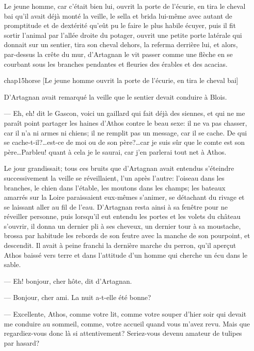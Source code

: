 Le jeune homme, car c'était bien lui, ouvrit la porte de l'écurie, en tira le cheval bai qu'il avait déjà monté la veille, le sella et brida lui-même avec autant de promptitude et de dextérité qu'eût pu le faire le plus habile écuyer, puis il fit sortir l'animal par l'allée droite du potager, ouvrit une petite porte latérale qui donnait sur un sentier, tira son cheval dehors, la referma derrière lui, et alors, par-dessus la crête du mur, d'Artagnan le vit passer comme une flèche en se courbant sous les branches pendantes et fleuries des érables et des acacias.

\begin{bwbigpic}
	[\basicscale] 
	{chap15horse}
	[Le jeune homme ouvrit la porte de l'écurie, en tira le cheval bai]
\end{bwbigpic}

D'Artagnan avait remarqué la veille que le sentier devait conduire à Blois.

— Eh, eh! dit le Gascon, voici un gaillard qui fait déjà des siennes, et qui ne me paraît point partager les haines d'Athos contre le beau sexe: il ne va pas chasser, car il n'a ni armes ni chiens; il ne remplit pas un message, car il se cache. De qui se cache-t-il?\dots est-ce de moi ou de son père?\dots car je suis sûr que le comte est son père\dots Parbleu! quant à cela je le saurai, car j'en parlerai tout net à Athos.

Le jour grandissait; tous ces bruits que d'Artagnan avait entendus s'éteindre successivement la veille se réveillaient, l'un après l'autre: l'oiseau dans les branches, le chien dans l'étable, les moutons dans les champs; les bateaux amarrés sur la Loire paraissaient eux-mêmes s'animer, se détachant du rivage et se laissant aller au fil de l'eau. D'Artagnan resta ainsi à sa fenêtre pour ne réveiller personne, puis lorsqu'il eut entendu les portes et les volets du château s'ouvrir, il donna un dernier pli à ses cheveux, un dernier tour à sa moustache, brossa par habitude les rebords de son feutre avec la manche de son pourpoint, et descendit. Il avait à peine franchi la dernière marche du perron, qu'il aperçut Athos baissé vers terre et dans l'attitude d'un homme qui cherche un écu dans le sable.

— Eh! bonjour, cher hôte, dit d'Artagnan.

— Bonjour, cher ami. La nuit a-t-elle été bonne?

— Excellente, Athos, comme votre lit, comme votre souper d'hier soir qui devait me conduire au sommeil, comme, votre accueil quand vous m'avez revu. Mais que regardiez-vous donc là si attentivement? Seriez-vous devenu amateur de tulipes par hasard?

